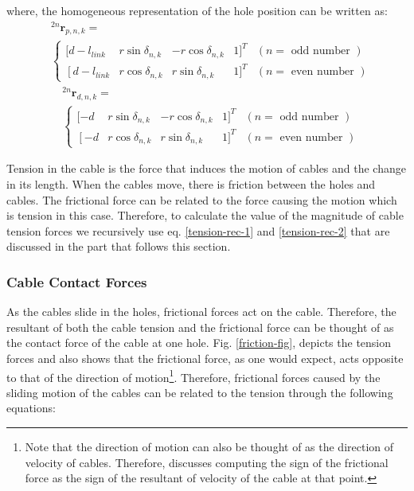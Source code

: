 \documentclass[a4paper,12pt]{report}
\begin{document}
where, the homogeneous representation of the hole position can be written as:
\begin{equation}
\begin{aligned}
&^{2 n} \boldsymbol{r}_{p, n, k}=\\
&\left\{\begin{array}{ccccc}
[d-l_{link} & r \sin{\delta_{n, k}} & -r \cos{\delta_{n, k}} & 1]^{T} & (n=\text { odd number }) \\
{\left[d-l_{link}\right.} & r \cos{\delta_{n, k}} & r \sin{\delta_{n, k}} & 1]^{T} & (n=\text { even number })
\end{array}\right.
\end{aligned}
\end{equation}
\begin{equation}
\begin{aligned}
&^{2 n} \boldsymbol{r}_{d, n, k}=\\
&\left\{\begin{array}{ccccc}
[-d & r \sin{\delta_{n, k}} & -r \cos{\delta_{n, k}} & 1]^{T} & (n=\text { odd number }) \\
{\left[-d\right.} & r \cos{\delta_{n, k}} & r \sin{\delta_{n, k}} & 1]^{T} & (n=\text { even number })
\end{array}\right.
\end{aligned}
\end{equation}

Tension in the cable is the force that induces the motion of cables and the change in its length. When the cables move, there is friction between the holes and cables. The frictional force can be related to the force causing the motion which is tension in this case. Therefore, to calculate the value of the magnitude of cable tension forces we recursively use eq. \ref{tension-rec-1} and \ref{tension-rec-2} that are discussed in the part that follows this section. 

\subsubsection{Cable Contact Forces}

As the cables slide in the holes, frictional forces act on the cable. Therefore, the resultant of both the cable tension and the frictional force can be thought of as the contact force of the cable at one hole. Fig. \ref{friction-fig}, depicts the tension forces and also shows that the frictional force, as one would expect, acts opposite to that of the direction of motion\footnote{Note that the direction of motion can also be thought of as the direction of velocity of cables. Therefore, \cite{RN30} discusses computing the sign of the frictional force as the sign of the resultant of velocity of the cable at that point.}. Therefore, frictional forces caused by the sliding motion of the cables can be related to the tension through the following equations:
\end{document}
